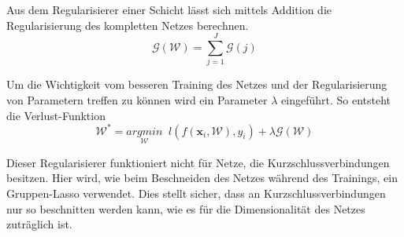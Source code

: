 Aus dem Regularisierer einer Schicht lässt sich mittels Addition die Regularisierung des kompletten Netzes berechnen.
\begin{equation}
 \mathcal{G}(\mathcal{W})=\sum_{j=1}^{J} \mathcal{G}(j)
\end{equation}


Um die Wichtigkeit vom besseren Training des Netzes und der Regularisierung von Parametern treffen zu können wird ein Parameter $\lambda$ eingeführt. So entsteht die Verlust-Funktion
\begin{equation}
 \mathcal{W}^{\ast}=\underset{\mathcal{W}}{arg min}\; \; l(f(\mathbf{x}_i, \mathcal{W}),y_i) + \lambda \mathcal{G}(\mathcal{W})
\end{equation}



Dieser Regularisierer funktioniert nicht für Netze, die Kurzschlussverbindungen besitzen. Hier wird, wie beim Beschneiden des Netzes während des Trainings, ein Gruppen-Lasso verwendet. Dies stellt sicher, dass an Kurzschlussverbindungen nur so beschnitten werden kann, wie es für die Dimensionalität des Netzes zuträglich ist.






